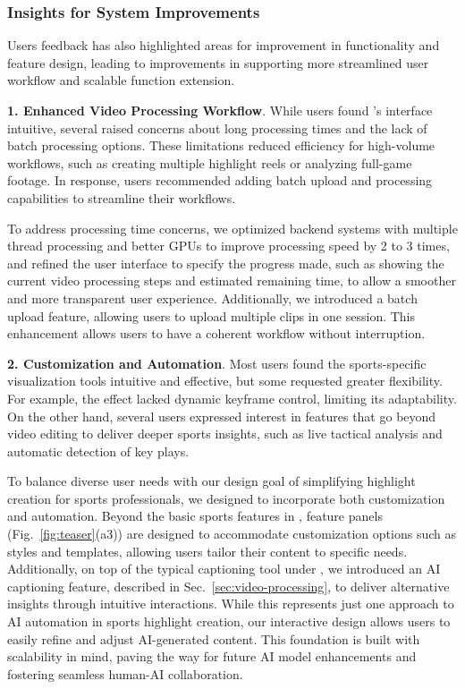 \subsubsection{Insights for System Improvements}

Users feedback has also highlighted areas for improvement in functionality and feature design, leading to improvements in supporting more streamlined user workflow and scalable function extension.

\textbf{1. Enhanced Video Processing Workflow}. While users found \SB{}'s interface intuitive, several raised concerns about long processing times and the lack of batch processing options. These limitations reduced efficiency for high-volume workflows, such as creating multiple highlight reels or analyzing full-game footage. 
In response, users recommended adding batch upload and processing capabilities to streamline their workflows.


To address processing time concerns, we optimized backend systems with multiple thread processing and better GPUs to improve processing speed by 2 to 3 times, and refined the user interface to specify the progress made, such as showing the current video processing steps and estimated remaining time, to allow a smoother and more transparent user experience. 
Additionally, we introduced a batch upload feature, allowing users to upload multiple clips in one session. This enhancement allows users to have a coherent workflow without interruption.
% 










\textbf{2. Customization and Automation}.
Most users found the sports-specific visualization tools intuitive and effective, but some requested greater flexibility. For example, the \Zoom{} effect lacked dynamic keyframe control, limiting its adaptability. 
On the other hand, several users expressed interest in features that go beyond video editing to deliver deeper sports insights, such as live tactical analysis and automatic detection of key plays.

To balance diverse user needs with our design goal of simplifying highlight creation for sports professionals, we designed \SB{} to incorporate both customization and automation. Beyond the basic sports features in \Highlight{}, feature panels (Fig.~\ref{fig:teaser}(a3)) are designed to accommodate customization options such as styles and templates, allowing users tailor their content to specific needs. 
Additionally, on top of the typical captioning tool under \Narrative{},
we introduced an AI captioning feature, described in Sec.~\ref{sec:video-processing}, to deliver alternative insights through intuitive interactions.  While this represents just one approach to AI automation in sports highlight creation, our interactive design allows users to easily refine and adjust AI-generated content. This foundation is built with scalability in mind, paving the way for future AI model enhancements and fostering seamless human-AI collaboration.




